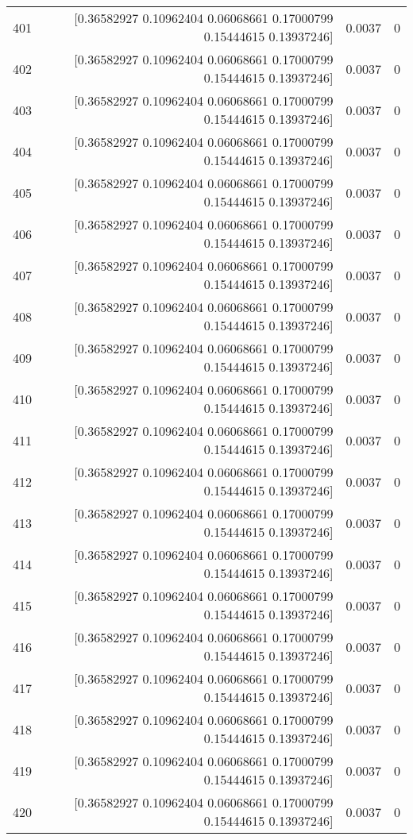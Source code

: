 \begin{longtable}{lrrr}
401 & [0.36582927 0.10962404 0.06068661 0.17000799 0.15444615 0.13937246] & 0.0037 & 0 \\
402 & [0.36582927 0.10962404 0.06068661 0.17000799 0.15444615 0.13937246] & 0.0037 & 0 \\
403 & [0.36582927 0.10962404 0.06068661 0.17000799 0.15444615 0.13937246] & 0.0037 & 0 \\
404 & [0.36582927 0.10962404 0.06068661 0.17000799 0.15444615 0.13937246] & 0.0037 & 0 \\
405 & [0.36582927 0.10962404 0.06068661 0.17000799 0.15444615 0.13937246] & 0.0037 & 0 \\
406 & [0.36582927 0.10962404 0.06068661 0.17000799 0.15444615 0.13937246] & 0.0037 & 0 \\
407 & [0.36582927 0.10962404 0.06068661 0.17000799 0.15444615 0.13937246] & 0.0037 & 0 \\
408 & [0.36582927 0.10962404 0.06068661 0.17000799 0.15444615 0.13937246] & 0.0037 & 0 \\
409 & [0.36582927 0.10962404 0.06068661 0.17000799 0.15444615 0.13937246] & 0.0037 & 0 \\
410 & [0.36582927 0.10962404 0.06068661 0.17000799 0.15444615 0.13937246] & 0.0037 & 0 \\
411 & [0.36582927 0.10962404 0.06068661 0.17000799 0.15444615 0.13937246] & 0.0037 & 0 \\
412 & [0.36582927 0.10962404 0.06068661 0.17000799 0.15444615 0.13937246] & 0.0037 & 0 \\
413 & [0.36582927 0.10962404 0.06068661 0.17000799 0.15444615 0.13937246] & 0.0037 & 0 \\
414 & [0.36582927 0.10962404 0.06068661 0.17000799 0.15444615 0.13937246] & 0.0037 & 0 \\
415 & [0.36582927 0.10962404 0.06068661 0.17000799 0.15444615 0.13937246] & 0.0037 & 0 \\
416 & [0.36582927 0.10962404 0.06068661 0.17000799 0.15444615 0.13937246] & 0.0037 & 0 \\
417 & [0.36582927 0.10962404 0.06068661 0.17000799 0.15444615 0.13937246] & 0.0037 & 0 \\
418 & [0.36582927 0.10962404 0.06068661 0.17000799 0.15444615 0.13937246] & 0.0037 & 0 \\
419 & [0.36582927 0.10962404 0.06068661 0.17000799 0.15444615 0.13937246] & 0.0037 & 0 \\
420 & [0.36582927 0.10962404 0.06068661 0.17000799 0.15444615 0.13937246] & 0.0037 & 0 \\

\end{longtable}
